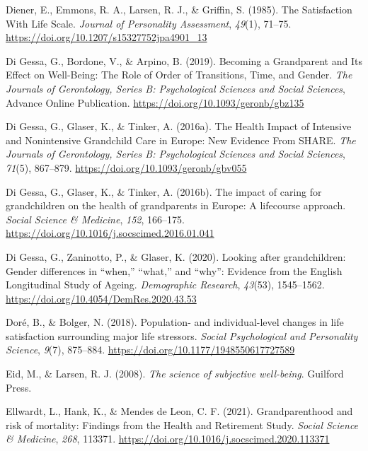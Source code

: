 \documentclass[
  english,
  man,floatsintext]{apa7}
\begin{document}
\leavevmode\hypertarget{ref-dienerSatisfactionLifeScale1985}{}%
Diener, E., Emmons, R. A., Larsen, R. J., \& Griffin, S. (1985). The Satisfaction With Life Scale. \emph{Journal of Personality Assessment}, \emph{49}(1), 71--75. \url{https://doi.org/10.1207/s15327752jpa4901_13}

\leavevmode\hypertarget{ref-digessaBecomingGrandparentIts2019}{}%
Di Gessa, G., Bordone, V., \& Arpino, B. (2019). Becoming a Grandparent and Its Effect on Well-Being: The Role of Order of Transitions, Time, and Gender. \emph{The Journals of Gerontology, Series B: Psychological Sciences and Social Sciences}, Advance Online Publication. \url{https://doi.org/10.1093/geronb/gbz135}

\leavevmode\hypertarget{ref-digessaHealthImpactIntensive2016}{}%
Di Gessa, G., Glaser, K., \& Tinker, A. (2016a). The Health Impact of Intensive and Nonintensive Grandchild Care in Europe: New Evidence From SHARE. \emph{The Journals of Gerontology, Series B: Psychological Sciences and Social Sciences}, \emph{71}(5), 867--879. \url{https://doi.org/10.1093/geronb/gbv055}

\leavevmode\hypertarget{ref-digessaImpactCaringGrandchildren2016}{}%
Di Gessa, G., Glaser, K., \& Tinker, A. (2016b). The impact of caring for grandchildren on the health of grandparents in Europe: A lifecourse approach. \emph{Social Science \& Medicine}, \emph{152}, 166--175. \url{https://doi.org/10.1016/j.socscimed.2016.01.041}

\leavevmode\hypertarget{ref-digessaLookingGrandchildrenGender2020}{}%
Di Gessa, G., Zaninotto, P., \& Glaser, K. (2020). Looking after grandchildren: Gender differences in ``when,'' ``what,'' and ``why'': Evidence from the English Longitudinal Study of Ageing. \emph{Demographic Research}, \emph{43}(53), 1545--1562. \url{https://doi.org/10.4054/DemRes.2020.43.53}

\leavevmode\hypertarget{ref-dorePopulationIndividuallevelChanges2018}{}%
Doré, B., \& Bolger, N. (2018). Population- and individual-level changes in life satisfaction surrounding major life stressors. \emph{Social Psychological and Personality Science}, \emph{9}(7), 875--884. \url{https://doi.org/10.1177/1948550617727589}

\leavevmode\hypertarget{ref-eidScienceSubjectiveWellbeing2008}{}%
Eid, M., \& Larsen, R. J. (2008). \emph{The science of subjective well-being}. Guilford Press.

\leavevmode\hypertarget{ref-ellwardtGrandparenthoodRiskMortality2021}{}%
Ellwardt, L., Hank, K., \& Mendes de Leon, C. F. (2021). Grandparenthood and risk of mortality: Findings from the Health and Retirement Study. \emph{Social Science \& Medicine}, \emph{268}, 113371. \url{https://doi.org/10.1016/j.socscimed.2020.113371}
\end{document}
